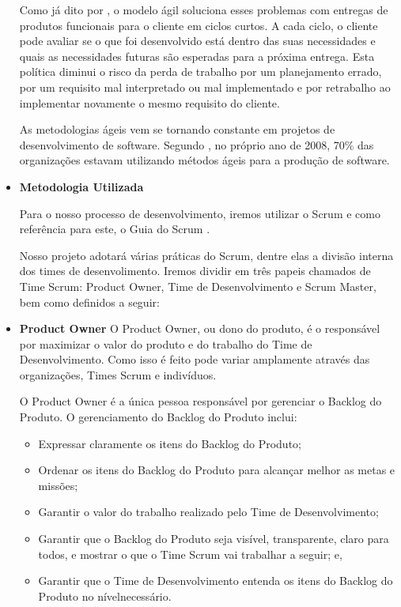\begin{itemize}
Como já dito por \cite{pressman}, o modelo ágil soluciona esses
problemas com entregas de produtos funcionais para o cliente em ciclos curtos. A
cada ciclo, o cliente pode avaliar se o que foi desenvolvido está dentro das suas
necessidades e quais as necessidades futuras são esperadas para a próxima
entrega. Esta política diminui o risco da perda de trabalho por um planejamento
errado, por um requisito mal interpretado ou mal implementado e por retrabalho
ao implementar novamente o mesmo requisito do cliente.

As metodologias ágeis vem se tornando constante em projetos de
desenvolvimento de software. Segundo \cite{dubakov}, no
próprio ano de 2008, 70\% das organizações estavam utilizando métodos ágeis
para a produção de software.

\item \textbf{Metodologia Utilizada}
\label{sec:Metodologia Utilizada}

Para o nosso processo de desenvolvimento, iremos utilizar o Scrum e como referência para
este, o Guia do Scrum \cite{guiaScrum}.

Nosso projeto adotará várias práticas do Scrum, dentre elas a divisão interna dos times de
desenvolimento. Iremos dividir em três papeis chamados de Time Scrum: Product Owner, Time de Desenvolvimento
 e Scrum Master, bem como definidos a seguir:

 \item \textbf{Product Owner}
 \label{subs:Product Owner}
O Product Owner, ou dono do produto, é o responsável por maximizar o valor do produto e do
trabalho do Time de Desenvolvimento. Como isso é feito pode variar amplamente através das
organizações, Times Scrum e indivíduos.

O Product Owner é a única pessoa responsável por gerenciar o Backlog do Produto. O
gerenciamento do Backlog do Produto inclui:

\begin{itemize}
\item  Expressar claramente os itens do Backlog do Produto;
\item Ordenar os itens do Backlog do Produto para alcançar melhor as metas e missões;
\item  Garantir o valor do trabalho realizado pelo Time de Desenvolvimento;
\item  Garantir que o Backlog do Produto seja visível, transparente, claro para todos, e mostrar o que o Time Scrum vai trabalhar a seguir; e,
\item Garantir que o Time de Desenvolvimento entenda os itens do Backlog do Produto no nívelnecessário.
\end{itemize}


\end{itemize}
